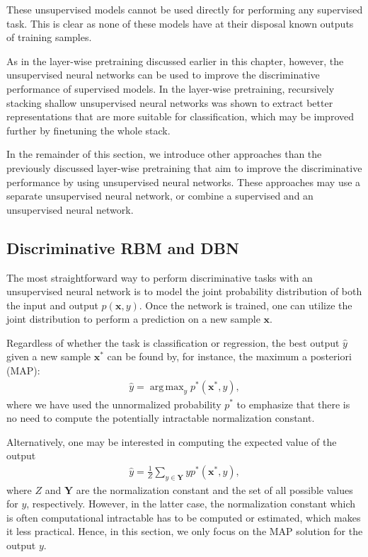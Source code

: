 \documentclass{now}
\newcommand{\vect}[1]{\mathbf{#1}}
\newcommand{\matr}[1]{\mathbf{#1}}
\newcommand{\vx}[0]{\vect{x}}
\newcommand{\mY}[0]{\matr{Y}}
\DeclareMathOperator*{\argmax}{arg\,max}
\begin{document}
These unsupervised models cannot be used directly for performing any supervised
task. This is clear as none of these models have at their disposal known outputs
of training samples.

As in the layer-wise pretraining discussed earlier in this chapter, however, the
unsupervised neural networks can be used to improve the discriminative
performance of supervised models. In the layer-wise pretraining, recursively
stacking shallow unsupervised neural networks was shown to extract better
representations that are more suitable for classification, which may be improved
further by finetuning the whole stack.

In the remainder of this section, we introduce other approaches than the
previously discussed layer-wise pretraining that aim to improve the
discriminative performance by using unsupervised neural networks. These
approaches may use a separate unsupervised neural network, or combine a
supervised and an unsupervised neural network.

\subsection{Discriminative RBM and DBN}
\label{sec:drbm}

The most straightforward way to perform discriminative tasks with an
unsupervised neural network is to model the joint probability distribution of
both the input and output $p(\vx, y)$. Once the network is trained, one can
utilize the joint distribution to perform a prediction on a new sample $\vx$. 

Regardless of whether the task is classification or regression, the best output
$\hat{y}$ given a new sample $\vx^*$ can be found by, for instance, the maximum
a posteriori (MAP):
\begin{align}
    \label{eq:gen_class}
    \hat{y} = \argmax_{y} p^*(\vx^*, y),
\end{align}
where we have used the unnormalized probability $p^*$ to emphasize that there is
no need to compute the potentially intractable normalization constant. 

Alternatively, one may be interested in computing the expected value of the
output 
\begin{align}
    \label{eq:gen_class}
    \hat{y} = \frac{1}{Z} \sum_{y \in \mY} y p^*(\vx^*, y),
\end{align}
where $Z$ and $\mY$ are the normalization constant and the set of all possible
values for $y$, respectively. However, in the latter case, the normalization
constant which is often computational intractable has to be computed or
estimated, which makes it less practical. Hence, in this section, we only focus
on the MAP solution for the output $y$.
\end{document}
